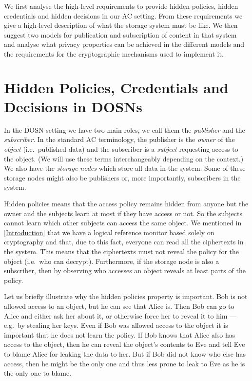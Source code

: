We first analyse the high-level requirements to provide hidden policies, hidden 
credentials and hidden decisions in our \ac{AC} setting.
From these requirements we give a high-level description of what the storage 
system must be like.
We then suggest two models for publication and subscription of content in that 
system and analyse what privacy properties can be achieved in the different 
models and the requirements for the cryptographic mechanisms used to implement 
it.


\section{Hidden Policies, Credentials and Decisions in 
  \acsp{DOSN}}\label{HiddenPCD}

In the \ac{DOSN} setting we have two main roles, we call them the 
\emph{publisher} and the \emph{subscriber}.
In the standard \ac{AC} terminology, the publisher is the \emph{owner} of the 
\emph{object} (i.e.\ published data) and the subscriber is a \emph{subject} 
requesting access to the object.
(We will use these terms interchangeably depending on the context.)
We also have the \emph{storage nodes} which store all data in the system.
Some of these storage nodes might also be publishers or, more importantly, 
subscribers in the system.

Hidden policies means that the access policy remains hidden from anyone but the 
owner and the subjects learn at most if they have access or not.
So the subjects cannot learn which other subjects can access the same object.
We mentioned in \cref{Introduction} that we have a logical reference monitor 
based solely on cryptography and that, due to this fact, everyone can read all 
the ciphertexts in the system.
This means that the ciphertexts must not reveal the policy for the object 
(i.e.\ who can decrypt).
Furthermore, if the storage node is also a subscriber, then by observing who 
accesses an object reveals at least parts of the policy.

Let us briefly illustrate why the hidden policies property is important.
Bob is not allowed access to an object, but he can see that Alice is.
Then Bob can go to Alice and either ask her about it, or otherwise force her to 
reveal it to him --- e.g.\ by stealing her keys.
Even if Bob was allowed access to the object it is important that he does not 
learn the policy.
If Bob knows that Alice also has access to the object, then he can reveal the 
object's contents to Eve and tell Eve to blame Alice for leaking the data to 
her.
But if Bob did not know who else has access, then he might be the only one and 
thus less prone to leak to Eve as he is the only one to blame.

